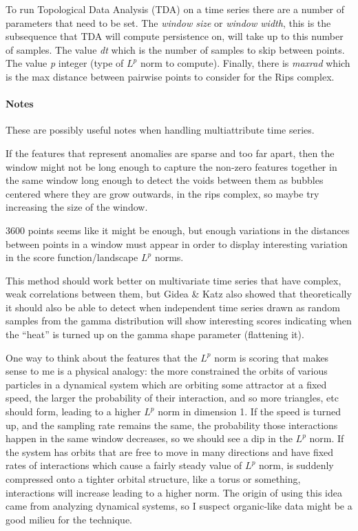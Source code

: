 \documentclass[titlepage, letterpaper, 12pt]{article}
\begin{document}
To run Topological Data Analysis (TDA) on a time series there are a number of parameters that need to be set.  The \textit{window size} or \textit{window width}, this is the subsequence that TDA will compute persistence on, will take up to this number of samples.  The value \textit{dt} which is the number of samples to skip between points.  The value \textit{p} integer (type of \(L^p\) norm to compute).  Finally, there is \textit{maxrad} which is the max distance between pairwise points to consider for the Rips complex.

\paragraph{Notes}
These are possibly useful notes when handling multiattribute time series.

If the features that represent anomalies are sparse and too far apart, then the window might not be long enough to capture the non-zero features together in the same window long enough to detect the voids between them as bubbles centered where they are grow outwards, in the rips complex, so maybe try increasing the size of the window.

3600 points seems like it might be enough, but enough variations in the distances between points in a window must appear in order to display interesting variation in the score function/landscape \(L^p\) norms.

This method should work better on multivariate time series that have complex, weak correlations between them, but Gidea \& Katz also showed that theoretically it should also be able to detect when independent time series drawn as random samples from the gamma distribution will show interesting scores indicating when the ``heat'' is turned up on the gamma shape parameter (flattening it).

One way to think about the features that the \(L^p\) norm is scoring that makes sense to me is a physical analogy: the more constrained the orbits of various particles in a dynamical system which are orbiting some 
attractor at a fixed speed, the larger the probability of their interaction, and so more triangles, etc should form, leading to a higher \(L^p\) norm in dimension 1.  If the speed is turned up, and the sampling 
rate remains the same, the probability those interactions happen in the same window decreases, so we should see a dip in the \(L^p\) norm.  If the system has orbits that are free to move in many directions and have 
fixed rates of interactions which cause a fairly steady value of \(L^p\) norm, is suddenly compressed onto a tighter orbital structure, like a torus or something, interactions will increase leading to a higher 
norm.  The origin of using this idea came from analyzing dynamical systems, so I suspect organic-like data might be a good milieu for the technique.
\end{document}
